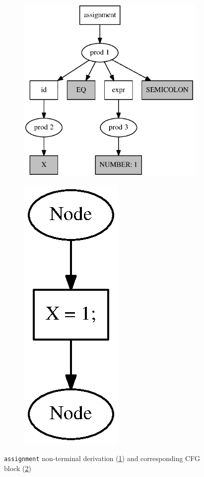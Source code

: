 \documentclass{sig-alternate-05-2015}
\begin{document}
\begin{figure}[h!]
  \begin{center}
    \begin{subfigure}{0.3\textwidth}    
        \includegraphics[scale=0.3]{Graphs/cfg_idea.eps}    
    \caption{}
    \label{simple_a}
    \end{subfigure}
    \begin{subfigure}{0.1\textwidth}      
            \includegraphics[scale=0.5]{Graphs/assignment_simple.eps}        
     \caption{}
     \label{simple_b}
    \end{subfigure}
    \caption{\texttt{assignment} non-terminal derivation (\ref{simple_a}) and corresponding CFG block (\ref{simple_b})}
    \label{simple_example_pic}
  \end{center}
\end{figure}
\end{document}
